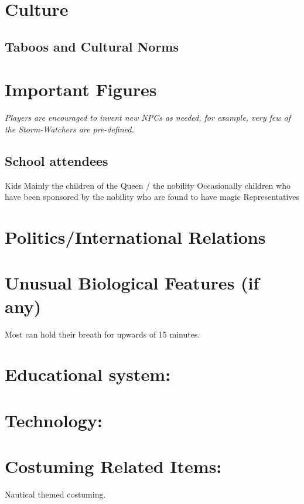 \documentclass[blue]{GL2020}
\begin{document}
\section*{Culture}

\subsection*{Taboos and Cultural Norms}

\section*{Important Figures}

\emph{Players are encouraged to invent new NPCs as needed, for example, very few of the Storm-Watchers are pre-defined.}

\subsection*{School attendees}

Kids
Mainly the children of the Queen / the nobility
Occasionally children who have been sponsored by the nobility who are found to have magic
Representatives

\section*{Politics/International Relations}

\section*{Unusual Biological Features (if any)}
Most \pShippies{} can hold their breath for upwards of 15 minutes.

\section{Educational system:}

\section{Technology:}

\section{Costuming Related Items:}
Nautical themed costuming.
\end{document}
